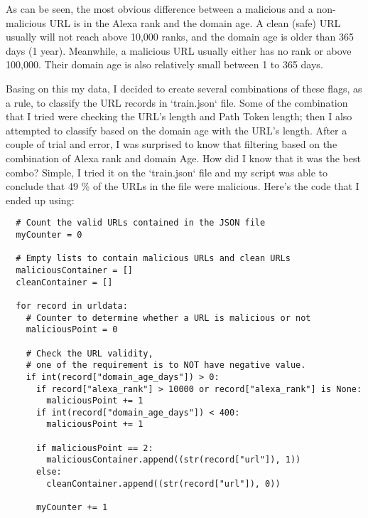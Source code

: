\documentclass[letterpaper,10pt,titlepage,draftclsnofoot,onecolumn]{IEEEtran}
\begin{document}
As can be seen, the most obvious difference between a malicious and a non-malicious URL is in the Alexa rank and the domain age.
A clean (safe) URL usually will not reach above 10,000 ranks, and the domain age is older than 365 days (1 year). 
Meanwhile, a malicious URL usually either has no rank or above 100,000. 
Their domain age is also relatively small between 1 to 365 days.

Basing on this my data, I decided to create several combinations of these flags, as a rule, to classify the URL records in `train.json` file.
Some of the combination that I tried were checking the URL's length and Path Token length; then I also attempted to classify based on the domain age with the URL's length. 
After a couple of trial and error, I was surprised to know that filtering based on the combination of Alexa rank and domain Age.
How did I know that it was the best combo? 
Simple, I tried it on the `train.json` file and my script was able to conclude that 49 \% of the URLs in the file were malicious.
Here's the code that I ended up using:
\begin{lstlisting}
  # Count the valid URLs contained in the JSON file
  myCounter = 0
    
  # Empty lists to contain malicious URLs and clean URLs
  maliciousContainer = []
  cleanContainer = []

  for record in urldata:
    # Counter to determine whether a URL is malicious or not
    maliciousPoint = 0

    # Check the URL validity, 
    # one of the requirement is to NOT have negative value.
    if int(record["domain_age_days"]) > 0:
      if record["alexa_rank"] > 10000 or record["alexa_rank"] is None:
        maliciousPoint += 1
      if int(record["domain_age_days"]) < 400:
        maliciousPoint += 1

      if maliciousPoint == 2:
        maliciousContainer.append((str(record["url"]), 1))
      else:
        cleanContainer.append((str(record["url"]), 0))

      myCounter += 1

\end{lstlisting}
\end{document}
